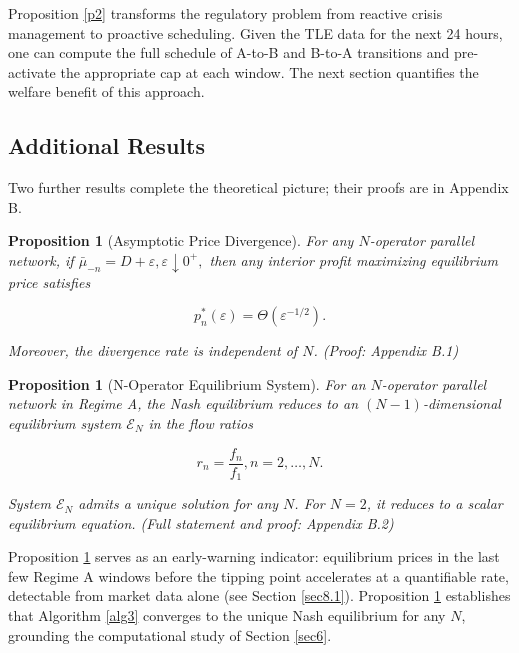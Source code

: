 \documentclass[review,3p,authoryear]{elsarticle}
\newtheorem{proposition}[theorem]{Proposition}
\begin{document}
Proposition \ref{p2} transforms the regulatory problem from reactive crisis management to proactive scheduling. Given the TLE data for the next 24 hours, one can compute the full schedule of A-to-B and B-to-A transitions and pre-activate the appropriate cap at each window. The next section quantifies the welfare benefit of this approach.

\subsection{Additional Results}

Two further results complete the theoretical picture; their proofs are in Appendix B.

\begin{proposition}[Asymptotic Price Divergence]\label{p3}
For any $N$-operator parallel network, if $\bar{{\mu}}_{-n}=D+{\varepsilon},{\varepsilon}{\downarrow}0^{+},$ then any interior profit maximizing equilibrium price satisfies

\begin{equation}
p_{n}^{*}({\varepsilon})={\Theta} \left({\varepsilon}^{-1/2}\right).
\end{equation}

Moreover, the divergence rate is independent of $N$. (Proof: Appendix B.1)
\end{proposition}

\begin{proposition}[N-Operator Equilibrium System]\label{p4}
For an $N$-operator parallel network in Regime A, the Nash equilibrium reduces to an $\left(N - 1\right)$-dimensional equilibrium system $\mathscr{E}_{N}$ in the flow ratios

\begin{equation}
r_{n}=\frac{f_{n}}{f_{1}},n=2,{\dots},N.
\end{equation}

System $\mathscr{E}_{N}$ admits a unique solution for any $N$. For $N=2$, it reduces to a scalar equilibrium equation. (Full statement and proof: Appendix B.2)
\end{proposition}

Proposition \ref{p3} serves as an early-warning indicator: equilibrium prices in the last few Regime A windows before the tipping point accelerates at a quantifiable rate, detectable from market data alone (see Section \ref{sec8.1}). Proposition \ref{p4} establishes that Algorithm \ref{alg3} converges to the unique Nash equilibrium for any $N$, grounding the computational study of Section \ref{sec6}.
\end{document}
